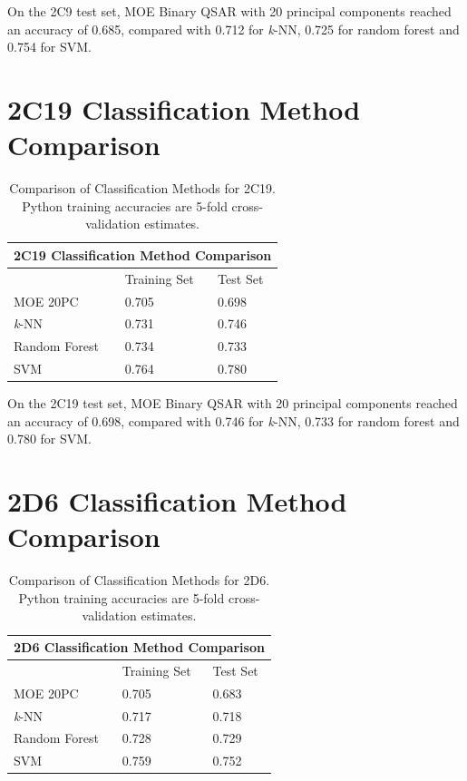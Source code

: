 On the 2C9 test set, MOE Binary QSAR with 20 principal components reached an accuracy of 0.685, compared with 0.712 for \textit{k}-NN, 0.725 for random forest and 0.754 for SVM.

\section{2C19 Classification Method Comparison}

\begin{table}[H]
\caption[Comparison of Classification Methods for 2C19]{Comparison of Classification Methods for 2C19. Python training accuracies are 5-fold cross-validation estimates.}
\centering
\begin{tabular}{|l|l|l|}
\hline
\multicolumn{3}{|c|}{2C19 Classification Method Comparison} \\ \hline
          & Training Set & Test Set \\ \hline
MOE 20PC  & 0.705        & 0.698    \\ \hline
\textit{k}-NN    & 0.731        & 0.746    \\ \hline
Random Forest & 0.734    & 0.733    \\ \hline
SVM       & 0.764        & 0.780    \\ \hline
\end{tabular}
\end{table}

On the 2C19 test set, MOE Binary QSAR with 20 principal components reached an accuracy of 0.698, compared with 0.746 for \textit{k}-NN, 0.733 for random forest and 0.780 for SVM.

\section{2D6 Classification Method Comparison}

\begin{table}[H]
\caption[Comparison of Classification Methods for 2D6]{Comparison of Classification Methods for 2D6. Python training accuracies are 5-fold cross-validation estimates.}
\centering
\begin{tabular}{|l|l|l|}
\hline
\multicolumn{3}{|c|}{2D6 Classification Method Comparison} \\ \hline
          & Training Set & Test Set \\ \hline
MOE 20PC  & 0.705        & 0.683    \\ \hline
\textit{k}-NN    & 0.717        & 0.718    \\ \hline
Random Forest & 0.728    & 0.729    \\ \hline
SVM       & 0.759        & 0.752    \\ \hline
\end{tabular}
\end{table}

